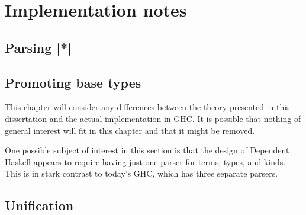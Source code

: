 \chapter{Implementation notes}
\label{cha:implementation}

\section{Parsing |*|}
\label{sec:parsing-star}

\section{Promoting base types}
\label{sec:promoting-base-types}

\begin{proposal}
This chapter will consider any differences between the theory presented
in this dissertation and the actual implementation in GHC. It is possible
that nothing of general interest will fit in this chapter and that it might
be removed.

One possible subject of interest in this section is that the design of
Dependent Haskell appears to require having just one parser for terms,
types, and kinds. This is in stark contrast to today's GHC, which has
three separate parsers.
\end{proposal}

\section{Unification}
\label{sec:unification}
